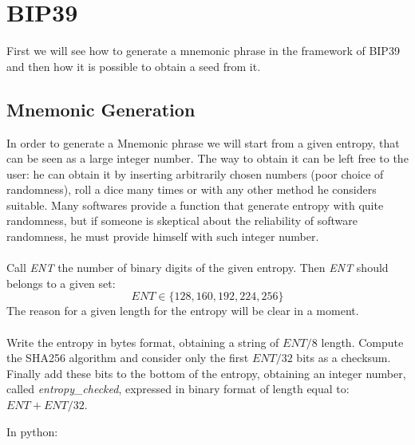 \section{BIP39}
First we will see how to generate a mnemonic phrase in the framework of BIP39 and then how it is possible to obtain a seed from it.

\subsection{Mnemonic Generation}
In order to generate a Mnemonic phrase we will start from a given entropy, that can be seen as a large integer number. The way to obtain it can be left free to the user: he can obtain it by inserting arbitrarily chosen numbers (poor choice of randomness), roll a dice many times or with any other method he considers suitable. Many softwares provide a function that generate entropy with quite randomness, but if someone is skeptical about the reliability of software randomness, he must provide himself with such integer number.
\\ \\
Call \textit{ENT} the number of binary digits of the given entropy. Then \textit{ENT} should belongs to a given set:
\begin{equation*}
	ENT \in \{128,160,192,224,256\}
\end{equation*}
The reason for a given length for the entropy will be clear in a moment.
\\ \\
Write the entropy in bytes format, obtaining a string of $ENT/8$ length. Compute the SHA256 algorithm and consider only the first $ENT/32$ bits as a checksum. Finally add these bits to the bottom of the entropy, obtaining an integer number, called \textit{entropy\_checked}, expressed in binary format of length equal to: $ENT+ENT/32$.

\begin{flushleft}
	In python:
\end{flushleft}

